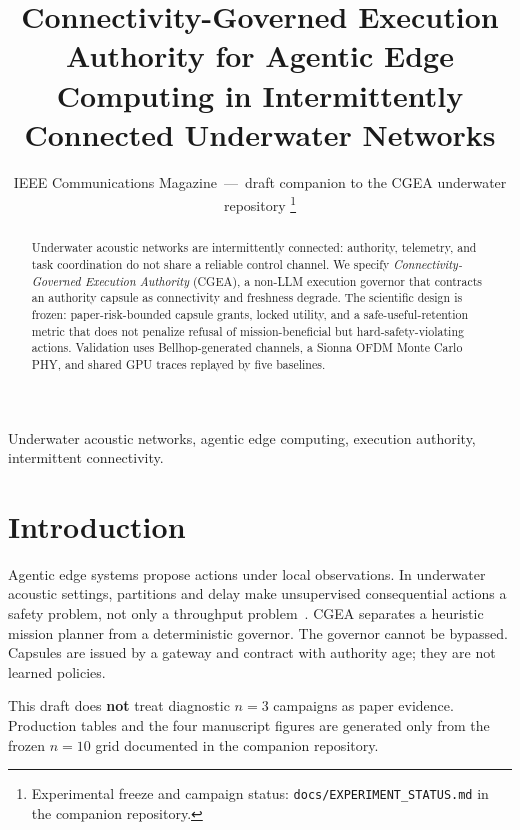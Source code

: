 \documentclass[journal]{IEEEtran}
\begin{document}
\title{Connectivity-Governed Execution Authority for Agentic Edge Computing in Intermittently Connected Underwater Networks}

\author{IEEE Communications Magazine~---~draft companion to the CGEA underwater repository%
\thanks{Experimental freeze and campaign status: \texttt{docs/EXPERIMENT\_STATUS.md} in the companion repository.}}

\maketitle

\begin{abstract}
Underwater acoustic networks are intermittently connected: authority, telemetry, and task coordination do not share a reliable control channel. We specify \emph{Connectivity-Governed Execution Authority} (CGEA), a non-LLM execution governor that contracts an authority capsule as connectivity and freshness degrade. The scientific design is frozen: paper-risk-bounded capsule grants, locked utility, and a safe-useful-retention metric that does not penalize refusal of mission-beneficial but hard-safety-violating actions. Validation uses Bellhop-generated channels, a Sionna OFDM Monte Carlo PHY, and shared GPU traces replayed by five baselines.
\end{abstract}

\begin{IEEEkeywords}
Underwater acoustic networks, agentic edge computing, execution authority, intermittent connectivity.
\end{IEEEkeywords}

\section{Introduction}

Agentic edge systems propose actions under local observations. In underwater acoustic settings, partitions and delay make unsupervised consequential actions a safety problem, not only a throughput problem~\cite{akyildiz2005,stojanovic2007}. CGEA separates a heuristic mission planner from a deterministic governor. The governor cannot be bypassed. Capsules are issued by a gateway and contract with authority age; they are not learned policies.

This draft does \textbf{not} treat diagnostic $n{=}3$ campaigns as paper evidence. Production tables and the four manuscript figures are generated only from the frozen $n{=}10$ grid documented in the companion repository.
\end{document}

